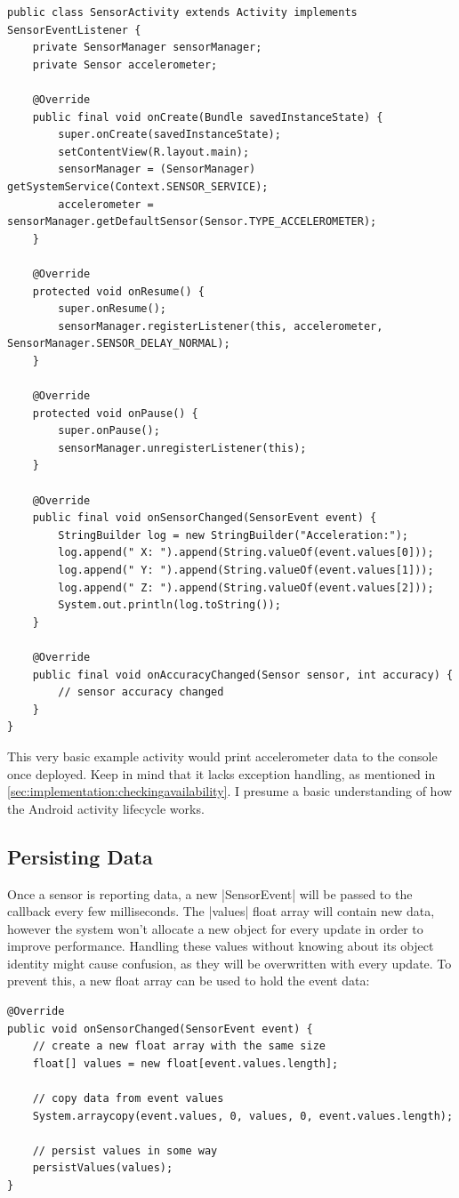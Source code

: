 \begin{lstlisting}[label=basicactivity]
public class SensorActivity extends Activity implements SensorEventListener {
	private SensorManager sensorManager;
	private Sensor accelerometer;

	@Override
	public final void onCreate(Bundle savedInstanceState) {
		super.onCreate(savedInstanceState);
		setContentView(R.layout.main);
		sensorManager = (SensorManager) getSystemService(Context.SENSOR_SERVICE);
		accelerometer = sensorManager.getDefaultSensor(Sensor.TYPE_ACCELEROMETER);
	}

	@Override
	protected void onResume() {
		super.onResume();
		sensorManager.registerListener(this, accelerometer, SensorManager.SENSOR_DELAY_NORMAL);
	}

	@Override
	protected void onPause() {
		super.onPause();
		sensorManager.unregisterListener(this);
	}

	@Override
	public final void onSensorChanged(SensorEvent event) {
		StringBuilder log = new StringBuilder("Acceleration:");
		log.append(" X: ").append(String.valueOf(event.values[0]));
		log.append(" Y: ").append(String.valueOf(event.values[1]));
		log.append(" Z: ").append(String.valueOf(event.values[2]));
		System.out.println(log.toString());
	}

	@Override
	public final void onAccuracyChanged(Sensor sensor, int accuracy) {
		// sensor accuracy changed
	}
}
\end{lstlisting}

This very basic example activity would print accelerometer data to the console once deployed.
Keep in mind that it lacks exception handling, as mentioned in \ref{sec:implementation:checkingavailability}.
I presume a basic understanding of how the Android activity\cite{androiddocs:activity} lifecycle works.

\subsection{Persisting Data}
Once a sensor is reporting data, a new |SensorEvent| will be passed to the callback every few milliseconds.
The |values| float array will contain new data, however the system won't allocate a new object for every update in order to improve performance.
Handling these values without knowing about its object identity might cause confusion, as they will be overwritten with every update.
To prevent this, a new float array can be used to hold the event data:

\begin{lstlisting}[label=arraycopy]
@Override
public void onSensorChanged(SensorEvent event) {
	// create a new float array with the same size
	float[] values = new float[event.values.length];

	// copy data from event values
	System.arraycopy(event.values, 0, values, 0, event.values.length);

	// persist values in some way
	persistValues(values);
}
\end{lstlisting}

